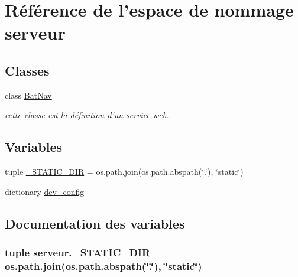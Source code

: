 \hypertarget{namespaceserveur}{\section{Référence de l'espace de nommage serveur}
\label{namespaceserveur}
}
\subsection*{Classes}
\begin{DoxyCompactItemize}
\item 
class \hyperlink{classserveur_1_1BatNav}{Bat\-Nav}
\begin{DoxyCompactList}\small\item\em cette classe est la définition d'un service web. \end{DoxyCompactList}\end{DoxyCompactItemize}
\subsection*{Variables}
\begin{DoxyCompactItemize}
\item 
tuple \hyperlink{namespaceserveur_a67de12cb5d8d1fc1b938786191e6e7a3}{\-\_\-\-S\-T\-A\-T\-I\-C\-\_\-\-D\-I\-R} = os.\-path.\-join(os.\-path.\-abspath(\char`\"{}.\char`\"{}), \char`\"{}static\char`\"{})
\item 
dictionary \hyperlink{namespaceserveur_ab0d89e80607d8c3e353fbdec568c25c1}{dev\-\_\-config}
\end{DoxyCompactItemize}


\subsection{Documentation des variables}
\hypertarget{namespaceserveur_a67de12cb5d8d1fc1b938786191e6e7a3}{
\subsubsection[{\-\_\-\-S\-T\-A\-T\-I\-C\-\_\-\-D\-I\-R}]{\setlength{\rightskip}{0pt plus 5cm}tuple serveur.\-\_\-\-S\-T\-A\-T\-I\-C\-\_\-\-D\-I\-R = os.\-path.\-join(os.\-path.\-abspath(\char`\"{}.\char`\"{}), \char`\"{}static\char`\"{})}}\label{namespaceserveur_a67de12cb5d8d1fc1b938786191e6e7a3}


